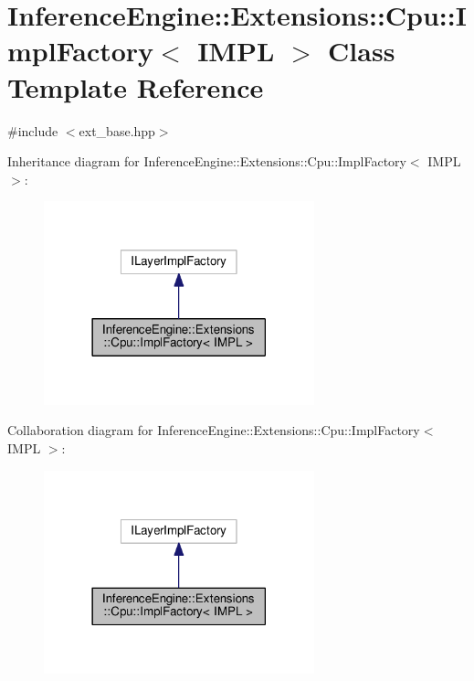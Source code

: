 \hypertarget{classInferenceEngine_1_1Extensions_1_1Cpu_1_1ImplFactory}{}\section{Inference\+Engine\+:\+:Extensions\+:\+:Cpu\+:\+:Impl\+Factory$<$ I\+M\+PL $>$ Class Template Reference}
\label{classInferenceEngine_1_1Extensions_1_1Cpu_1_1ImplFactory}


{\ttfamily \#include $<$ext\+\_\+base.\+hpp$>$}



Inheritance diagram for Inference\+Engine\+:\+:Extensions\+:\+:Cpu\+:\+:Impl\+Factory$<$ I\+M\+PL $>$\+:
\nopagebreak
\begin{figure}[H]
\begin{center}
\leavevmode
\includegraphics[width=222pt]{classInferenceEngine_1_1Extensions_1_1Cpu_1_1ImplFactory__inherit__graph}
\end{center}
\end{figure}


Collaboration diagram for Inference\+Engine\+:\+:Extensions\+:\+:Cpu\+:\+:Impl\+Factory$<$ I\+M\+PL $>$\+:
\nopagebreak
\begin{figure}[H]
\begin{center}
\leavevmode
\includegraphics[width=222pt]{classInferenceEngine_1_1Extensions_1_1Cpu_1_1ImplFactory__coll__graph}
\end{center}
\end{figure}
